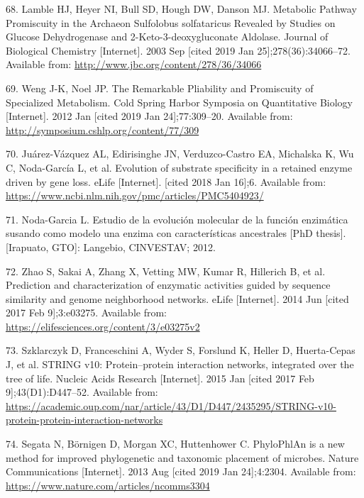 \documentclass[12pt,twoside]{reedthesis}
\begin{document}
  \hypertarget{ref-lamble_archaea_promiscuou_pathways_2003}{}
  68. Lamble HJ, Heyer NI, Bull SD, Hough DW, Danson MJ. Metabolic Pathway
  Promiscuity in the Archaeon Sulfolobus solfataricus Revealed by Studies
  on Glucose Dehydrogenase and 2-Keto-3-deoxygluconate Aldolase. Journal
  of Biological Chemistry {[}Internet{]}. 2003 Sep {[}cited 2019 Jan
  25{]};278(36):34066--72. Available from:
  \url{http://www.jbc.org/content/278/36/34066}
  
  \hypertarget{ref-weng_promiscuity_specialized_pathways_2012}{}
  69. Weng J-K, Noel JP. The Remarkable Pliability and Promiscuity of
  Specialized Metabolism. Cold Spring Harbor Symposia on Quantitative
  Biology {[}Internet{]}. 2012 Jan {[}cited 2019 Jan 24{]};77:309--20.
  Available from: \url{http://symposium.cshlp.org/content/77/309}
  
  \hypertarget{ref-juarez-vazquez_evolution_2017}{}
  70. Juárez-Vázquez AL, Edirisinghe JN, Verduzco-Castro EA, Michalska K,
  Wu C, Noda-García L, et al. Evolution of substrate specificity in a
  retained enzyme driven by gene loss. eLife {[}Internet{]}. {[}cited 2018
  Jan 16{]};6. Available from:
  \url{https://www.ncbi.nlm.nih.gov/pmc/articles/PMC5404923/}
  
  \hypertarget{ref-noda_tesis_2012}{}
  71. Noda-Garcia L. Estudio de la evolución molecular de la función
  enzimática susando como modelo una enzima con características
  ancestrales {[}PhD thesis{]}. {[}Irapuato, GTO{]}: Langebio, CINVESTAV;
  2012.
  
  \hypertarget{ref-zhao__function_prediction_neighbourhood_2014}{}
  72. Zhao S, Sakai A, Zhang X, Vetting MW, Kumar R, Hillerich B, et al.
  Prediction and characterization of enzymatic activities guided by
  sequence similarity and genome neighborhood networks. eLife
  {[}Internet{]}. 2014 Jun {[}cited 2017 Feb 9{]};3:e03275. Available
  from: \url{https://elifesciences.org/content/3/e03275v2}
  
  \hypertarget{ref-szklarczyk_string_2015}{}
  73. Szklarczyk D, Franceschini A, Wyder S, Forslund K, Heller D,
  Huerta-Cepas J, et al. STRING v10: Protein--protein interaction
  networks, integrated over the tree of life. Nucleic Acids Research
  {[}Internet{]}. 2015 Jan {[}cited 2017 Feb 9{]};43(D1):D447--52.
  Available from:
  \url{https://academic.oup.com/nar/article/43/D1/D447/2435295/STRING-v10-protein-protein-interaction-networks}
  
  \hypertarget{ref-segata_phylophlan_2013}{}
  74. Segata N, Börnigen D, Morgan XC, Huttenhower C. PhyloPhlAn is a new
  method for improved phylogenetic and taxonomic placement of microbes.
  Nature Communications {[}Internet{]}. 2013 Aug {[}cited 2019 Jan
  24{]};4:2304. Available from:
  \url{https://www.nature.com/articles/ncomms3304}
  
\end{document}
